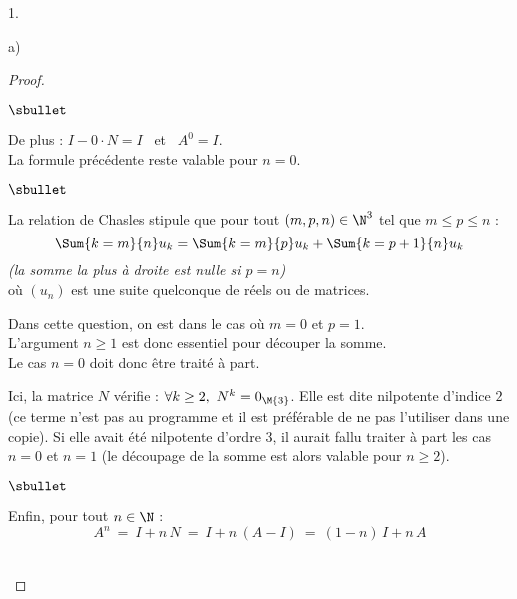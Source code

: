 \documentclass[11pt]{article}%
\begin{document}
\begin{noliste}{1.}
\begin{noliste}{a)}
\begin{proof}
\begin{noliste}{$\sbullet$}
      \item De plus : $I - 0 \cdot N = I$ \ et \ $A^0 = I$.\\
        La formule précédente reste valable pour $n = 0$.
      \end{noliste}
      \begin{remarkL}{.98}%
        \begin{noliste}{$\sbullet$}
        \item La \og relation de Chasles \fg{} stipule que pour tout
          $(m, p, n) \in \N^3$ tel que $m \leq p \leq n$ :
          \[
          \Sum{k = m}{n} u_k = \Sum{k = m}{p} u_k + \Sum{k = p+1}{n}
          u_k
          \]
          {\it (la somme la plus à droite est nulle si $p = n$)}\\
          où $(u_n)$ est une suite quelconque de réels ou de matrices.
        \item Dans cette question, on est dans le cas où $m = 0$ et $p
          = 1$.\\
          L'argument $n \geq 1$ est donc essentiel pour découper la
          somme.\\
          Le cas $n = 0$ doit donc être traité à part.
        \item Ici, la matrice $N$ vérifie : $\forall k \geq 2, \ N^k =
          0_{\M{3}}$. Elle est dite nilpotente d'indice $2$ (ce terme
          n'est pas au programme et il est préférable de ne pas
          l'utiliser dans une copie). Si elle avait été nilpotente
          d'ordre $3$, il aurait fallu traiter à part les cas $n = 0$
          et $n = 1$ (le découpage de la somme est alors valable pour
          $n \geq 2$).
        \end{noliste}
      \end{remarkL}%
      \begin{noliste}{$\sbullet$}
      \item Enfin, pour tout $n \in \N$ :
        \[
        A^{n} \ = \ I + n \, N \ = \ I + n \, (A - I) \ = \ (1 - n) \,
        I + n \, A
        \]
        ~\\[-1.4cm] 
      \end{noliste}
    \end{proof}



\end{noliste}
\end{noliste}
\end{document}
